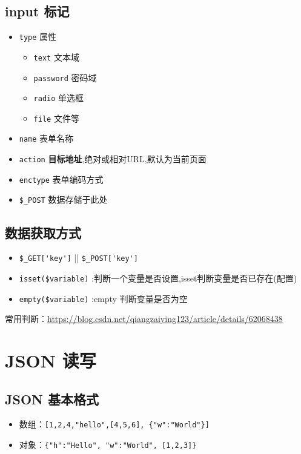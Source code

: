 \documentclass[UTF8,a4paper,12pt]{ctexbook}
\begin{document}
		\subsection{input 标记}
			\begin{itemize}
				\item \verb|type| 属性
					\begin{itemize}
						\item \verb|text| 文本域
						\item \verb|password| 密码域
						\item \verb|radio| 单选框
						\item \verb|file| 文件等
					\end{itemize}
				\item \verb|name| 表单名称
				\item \verb|action| \textbf{目标地址},绝对或相对URL,默认为当前页面
				\item \verb|enctype| 表单编码方式
				\item \verb|$_POST| 数据存储于此处
			\end{itemize}
		
		\subsection{数据获取方式}
			\begin{itemize}
				\item \verb|$_GET['key']| || \verb|$_POST['key']|
				\item \verb|isset($variable)| :判断一个变量是否设置,isset判断变量是否已存在(配置)
				\item \verb|empty($variable)| :empty 判断变量是否为空
			\end{itemize}
			
			常用判断：\url{https://blog.csdn.net/qiangzaiying123/article/details/62068438}
	
	\section{JSON 读写}
		\subsection{JSON 基本格式}
			\begin{itemize}
				\item 数组：\verb|[1,2,4,"hello",[4,5,6], {"w":"World"}]|
				\item 对象：\verb|{"h":"Hello", "w":"World", [1,2,3]}|
			\end{itemize}
		
\end{document}
